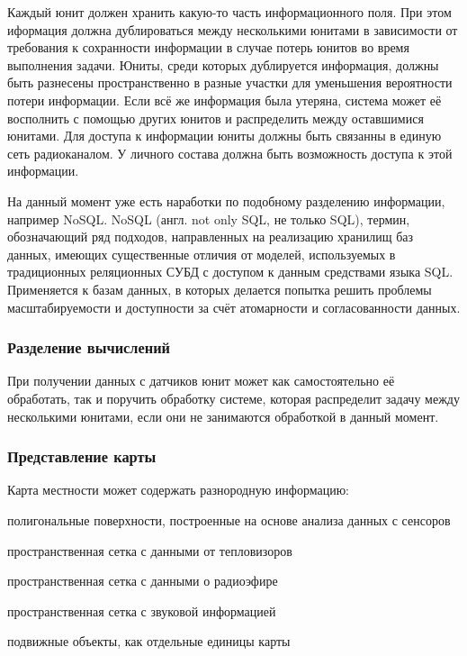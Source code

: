 Каждый юнит должен хранить какую-то часть информационного поля.
При этом иформация должна дублироваться между несколькими юнитами в
зависимости от требования к сохранности информации в случае потерь
юнитов во время выполнения задачи. Юниты, среди которых дублируется
информация, должны быть разнесены пространственно в разные участки
для уменьшения вероятности потери информации. Если всё же информация
была утеряна, система может её восполнить с помощью других юнитов и 
распределить между оставшимися юнитами. Для доступа к информации юниты
должны быть связанны в единую сеть радиоканалом. У личного состава
должна быть возможность доступа к этой информации. 

На данный момент уже есть наработки по подобному разделению информации,
например NoSQL. NoSQL (англ. not only SQL, не только SQL), термин,
обозначающий ряд подходов, направленных на реализацию хранилищ баз
данных, имеющих существенные отличия от моделей, используемых в
традиционных реляционных СУБД с доступом к данным средствами языка SQL.
Применяется к базам данных, в которых делается попытка решить проблемы
масштабируемости и доступности за счёт атомарности и согласованности
данных.

\subsubsection{Разделение вычислений}

При получении данных с датчиков юнит может как самостоятельно
её обработать, так и поручить обработку системе, которая
распределит задачу между несколькими юнитами, если они не
занимаются обработкой в данный момент.

\subsubsection{Представление карты}

Карта местности может содержать разнородную информацию:
\begin{mintemize}
    \item полигональные поверхности, построенные на основе анализа
        данных с сенсоров
    \item пространственная сетка с данными от тепловизоров
    \item пространственная сетка с данными о радиоэфире
    \item пространственная сетка с звуковой информацией
    \item подвижные объекты, как отдельные единицы карты
\end{mintemize}

